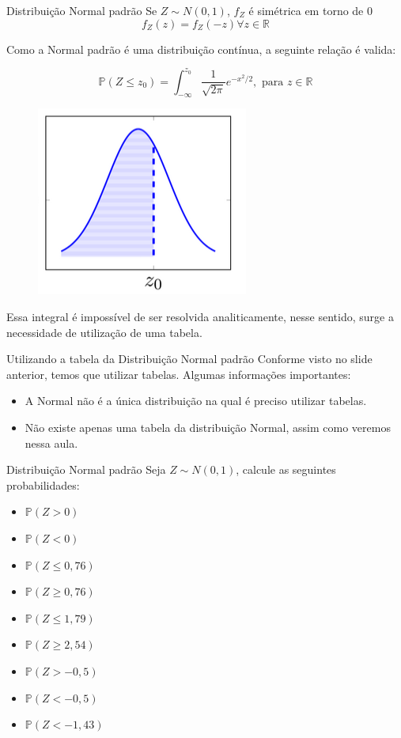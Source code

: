 \begin{frame}{Distribuição Normal padrão}
    Se $Z \sim N(0,1)$, $f_Z$ é simétrica em torno de 0
    $$f_Z(z) = f_Z(-z) \forall z \in \mathbb{R}$$

    Como a Normal padrão é uma distribuição contínua, a seguinte relação é valida:

    $$\mathds{P}(Z \leq z_0) = \int_{-\infty}^{z_0}\dfrac{1}{\sqrt{2\pi}} e^{-x^2/2}, \text{ para } z\in \mathbb{R}$$

    \begin{figure}
        \centering
        \includegraphics[width=0.3\linewidth]{figures/normal_p_1.png}
    \end{figure}

    Essa integral é impossível de ser resolvida analiticamente, nesse sentido, surge a necessidade de utilização de uma tabela.
\end{frame}

\begin{frame}{Utilizando a tabela da Distribuição Normal padrão}
    Conforme visto no slide anterior, temos que utilizar tabelas. Algumas informações importantes:

    \begin{itemize}
        \item A Normal não é a única distribuição na qual é preciso utilizar tabelas.
        \item Não existe apenas uma tabela da distribuição Normal, assim como veremos nessa aula. 
    \end{itemize}
\end{frame}

\begin{frame}{Distribuição Normal padrão}
Seja $Z \sim N(0,1)$, calcule as seguintes probabilidades:

\begin{itemize}
    \item $\mathds{P}(Z > 0)$
    \item $\mathds{P}(Z < 0)$
    \item $\mathds{P}(Z \leq 0,76)$
     \item$ \mathds{P}(Z \geq 0,76)$
     \item$ \mathds{P}(Z \leq 1,79)$
     \item$ \mathds{P}(Z \geq 2,54)$
     \item$ \mathds{P}(Z > -0,5)$
     \item$ \mathds{P}(Z < -0,5)$
     \item$ \mathds{P}(Z < -1,43)$
\end{itemize}
    
\end{frame}

